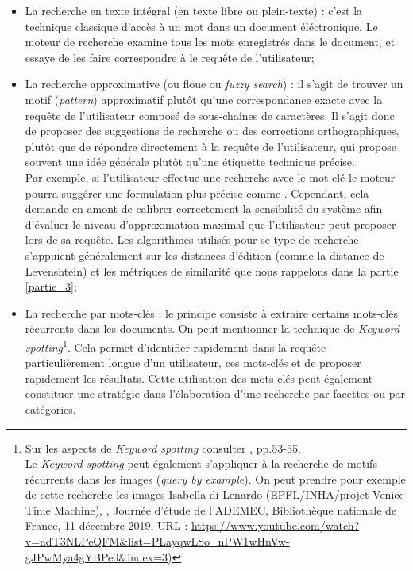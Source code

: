 \bigskip
\begin{itemize}
    \item La recherche en texte intégral (en texte libre ou plein-texte) : c'est la technique classique d'accès à un mot dans un document éléctronique. Le moteur de recherche examine tous les mots enregistrés dans le document, et essaye de les faire correspondre à le requête de l'utilisateur;\\
    \item La recherche approximative (ou floue ou \textit{fuzzy search}) : il s'agit de trouver un motif (\textit{pattern}) approximatif plutôt qu'une correspondance exacte avec la requête de l'utilisateur composé de sous-chaînes de caractères. Il s'agit donc de proposer des suggestions de recherche ou des corrections orthographiques, plutôt que de répondre directement à la requête de l'utilisateur, qui propose souvent une idée générale plutôt qu'une étiquette technique précise.\\Par exemple, si l'utilisateur effectue une recherche avec le mot-clé  le moteur pourra suggérer une formulation plus précise comme . Cependant, cela demande en amont de calibrer correctement la sensibilité du système afin d'évaluer le niveau d'approximation maximal que l'utilisateur peut proposer lors de sa requête.
    Les algorithmes utilisés pour se type de recherche s'appuient généralement sur les distances d'édition (comme la distance de Levenshtein) et les métriques de similarité que nous rappelons dans la partie \ref{partie_3};\\
    \item La recherche par mots-clés : le principe consiste à extraire certains mots-clés récurrents dans les documents. On peut mentionner la technique de \textit{Keyword spotting}\footnote{Sur les aspects de \textit{Keyword spotting} consulter \cite{bonhomme_defis_2018}, pp.53-55. \\ Le \textit{Keyword spotting} peut également s'appliquer à la recherche de motifs récurrents dans les images (\textit{query by example}). On peut prendre pour exemple de cette recherche les images Isabella di Lenardo (EPFL/INHA/projet Venice Time Machine), , Journée d'étude  de l'ADEMEC, Bibliothèque nationale de France, 11 décembre 2019, URL : \url{https://www.youtube.com/watch?v=ndT3NLPeQFM&list=PLayqwLSo_nPW1wHnVw-gJPwMya4gYBPe0&index=3})}. Cela permet d'identifier rapidement dans la requête particulièrement longue d'un utilisateur, ces mots-clés et de proposer rapidement les résultats. Cette utilisation des mots-clés peut également constituer une stratégie dans l'élaboration d'une recherche par facettes ou par catégories. 
\end{itemize}
